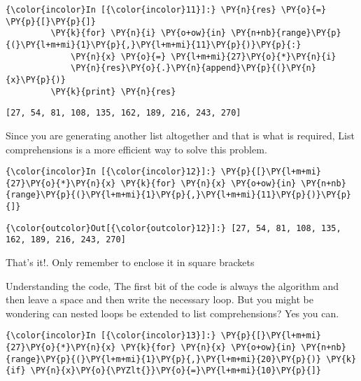     \begin{Verbatim}[commandchars=\\\{\}]
{\color{incolor}In [{\color{incolor}11}]:} \PY{n}{res} \PY{o}{=} \PY{p}{[}\PY{p}{]}
         \PY{k}{for} \PY{n}{i} \PY{o+ow}{in} \PY{n+nb}{range}\PY{p}{(}\PY{l+m+mi}{1}\PY{p}{,}\PY{l+m+mi}{11}\PY{p}{)}\PY{p}{:}
             \PY{n}{x} \PY{o}{=} \PY{l+m+mi}{27}\PY{o}{*}\PY{n}{i}
             \PY{n}{res}\PY{o}{.}\PY{n}{append}\PY{p}{(}\PY{n}{x}\PY{p}{)}
         \PY{k}{print} \PY{n}{res}
\end{Verbatim}

    \begin{Verbatim}[commandchars=\\\{\}]
[27, 54, 81, 108, 135, 162, 189, 216, 243, 270]
    \end{Verbatim}

    Since you are generating another list altogether and that is what is
required, List comprehensions is a more efficient way to solve this
problem.

    \begin{Verbatim}[commandchars=\\\{\}]
{\color{incolor}In [{\color{incolor}12}]:} \PY{p}{[}\PY{l+m+mi}{27}\PY{o}{*}\PY{n}{x} \PY{k}{for} \PY{n}{x} \PY{o+ow}{in} \PY{n+nb}{range}\PY{p}{(}\PY{l+m+mi}{1}\PY{p}{,}\PY{l+m+mi}{11}\PY{p}{)}\PY{p}{]}
\end{Verbatim}

            \begin{Verbatim}[commandchars=\\\{\}]
{\color{outcolor}Out[{\color{outcolor}12}]:} [27, 54, 81, 108, 135, 162, 189, 216, 243, 270]
\end{Verbatim}
        
    That's it!. Only remember to enclose it in square brackets

    Understanding the code, The first bit of the code is always the
algorithm and then leave a space and then write the necessary loop. But
you might be wondering can nested loops be extended to list
comprehensions? Yes you can.

    \begin{Verbatim}[commandchars=\\\{\}]
{\color{incolor}In [{\color{incolor}13}]:} \PY{p}{[}\PY{l+m+mi}{27}\PY{o}{*}\PY{n}{x} \PY{k}{for} \PY{n}{x} \PY{o+ow}{in} \PY{n+nb}{range}\PY{p}{(}\PY{l+m+mi}{1}\PY{p}{,}\PY{l+m+mi}{20}\PY{p}{)} \PY{k}{if} \PY{n}{x}\PY{o}{\PYZlt{}}\PY{o}{=}\PY{l+m+mi}{10}\PY{p}{]}
\end{Verbatim}

